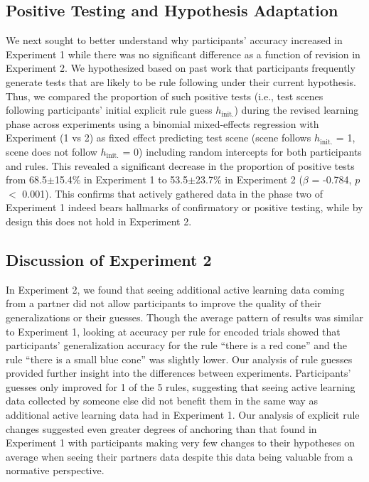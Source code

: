 \documentclass[doc,natbib,floatsintext]{apa7}
\newcommand{\hi}{h_{\mathrm{init.}}}
\begin{document}
 
\subsection{Positive Testing and Hypothesis Adaptation}

We next sought to better understand why participants' accuracy increased in Experiment 1 while there was no significant difference as a function of revision in Experiment 2. We hypothesized based on past work \citep{wason1960failure, klayman1987confirmation} that participants frequently generate tests that are likely to be rule following under their current hypothesis. Thus, we compared the proportion of such positive tests (i.e., test scenes following participants' initial explicit rule guess $\hi$) during the revised learning phase across experiments using a binomial mixed-effects regression with Experiment (1 vs 2) as fixed effect predicting test scene (scene follows $\hi$ = 1, scene does not follow $\hi$ = 0) including random intercepts for both participants and rules. This revealed a significant decrease in the proportion of positive tests from 68.5$\pm$15.4\% in Experiment 1 to 53.5$\pm$23.7\% in Experiment 2 ($\beta$ = -0.784, $p$ $<$ 0.001). This confirms that actively gathered data in the phase two of Experiment 1 indeed bears hallmarks of confirmatory or positive testing, while by design this does not hold in Experiment 2. 

\subsection{Discussion of Experiment 2}
In Experiment 2, we found that seeing additional active learning data coming from a partner did not allow participants to improve the quality of their generalizations or their guesses. Though the average pattern of results was similar to Experiment 1, looking at accuracy per rule for encoded trials showed that participants' generalization accuracy for the rule ``there is a red cone'' and the rule ``there is a small blue cone'' was slightly lower. Our analysis of rule guesses provided further insight into the differences between experiments. Participants' guesses only improved for 1 of the 5 rules, suggesting that seeing active learning data collected by someone else did not benefit them in the same way as additional active learning data had in Experiment 1. Our analysis of explicit rule changes suggested even greater degrees of anchoring than that found in Experiment 1 with participants making very few changes to their hypotheses on average when seeing their partners data despite this data being valuable from a normative perspective.
\end{document}
